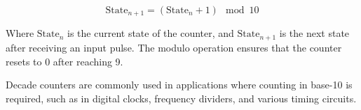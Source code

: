 \[
\text{State}_{n+1} = (\text{State}_n + 1) \mod 10
\]

Where \(\text{State}_n\) is the current state of the counter, and \(\text{State}_{n+1}\) is the next state after receiving an input pulse. The modulo operation ensures that the counter resets to 0 after reaching 9.

Decade counters are commonly used in applications where counting in base-10 is required, such as in digital clocks, frequency dividers, and various timing circuits.

